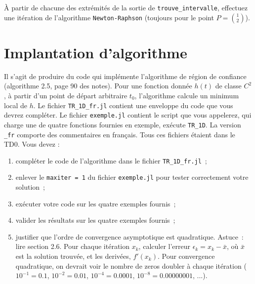 \documentclass[12pt]{article}
\begin{document}
\`A partir de chacune des extrémités de la sortie de \verb|trouve_intervalle|, effectuez une it\'eration de l'algorithme {\tt Newton-Raphson} (toujours pour le point $P={1\choose 2}$).

\section{Implantation d'algorithme}

Il s'agit de produire
du code qui implémente l'algorithme de région de confiance (algorithme 2.5, page 90 des
notes). Pour une fonction donnée $h(t)$ de classe $C^2$, à partir d'un point de départ arbitraire
$t_0$, l'algorithme calcule un minimum local de $h$.
Le fichier \verb|TR_1D_fr.jl| contient une enveloppe du code que vous devrez compléter. Le
fichier \verb|exemple.jl| contient le script que vous appelerez, qui charge une de quatre fonctions
fournies en exemple, exécute \verb|TR_1D|. La version \verb|_fr| comporte des commentaires en français.
Tous ces fichiers étaient dans le TD0.
Vous devez :
\begin{enumerate}
\item compléter le code de l'algorithme dans le fichier \verb|TR_1D_fr.jl| ;
\item enlever le \verb|maxiter = 1| du fichier \verb|exemple.jl| pour tester correctement votre solution ;
\item exécuter votre code sur les quatre exemples fournis ;
\item valider les résultats sur les quatre exemples fournis ;
\item justifier que l'ordre de convergence asymptotique est quadratique. Astuce : lire section 2.6. Pour chaque itération $x_k$, calculer l’erreur $\epsilon_k=x_k-\bar x$, où $\bar x$ est la solution trouvée, et les derivées, $f'(x_k)$. Pour convergence quadratique, on devrait voir le nombre de zeros doubler à chaque itération ($10^{-1}=0.1$, $10^{-2}=0.01$, $10^{-4}=0.0001$, $10^{-8}=0.00000001$, ...).  
\end{enumerate}
\end{document}
